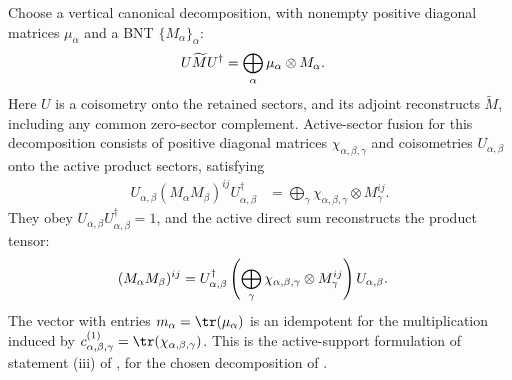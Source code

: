 \begin{definition}%
    \label{def:mpdo_bnt_fusion_tensor_clause}
    \leanok
    Choose a vertical canonical decomposition, with nonempty positive
    diagonal matrices $\mu_\alpha$ and a BNT $\{M_\alpha\}_\alpha$:
    \begin{align}
        U\widetilde M U^\dagger
         & =\bigoplus_\alpha \mu_\alpha\otimes M_\alpha.
        \notag
    \end{align}
    Here $U$ is a coisometry onto the retained sectors, and its adjoint
    reconstructs $\widetilde M$, including any common zero-sector complement.
    Active-sector fusion for this decomposition consists of positive diagonal
    matrices $\chi_{\alpha,\beta,\gamma}$ and coisometries
    $U_{\alpha,\beta}$ onto the active product sectors, satisfying
    \begin{align}
        U_{\alpha,\beta}(M_\alpha M_\beta)^{ij}
        U_{\alpha,\beta}^\dagger
         & =\bigoplus_\gamma
        \chi_{\alpha,\beta,\gamma}\otimes M_\gamma^{ij}.
        \label{eq:rfp_active_fusion}
    \end{align}
    They obey $U_{\alpha,\beta}U_{\alpha,\beta}^\dagger=1$, and the active
    direct sum reconstructs the product tensor:
    \begin{align}
        (M_\alpha M_\beta)^{ij}
         & =U_{\alpha,\beta}^\dagger
        \left(\bigoplus_\gamma
        \chi_{\alpha,\beta,\gamma}\otimes M_\gamma^{ij}\right)
        U_{\alpha,\beta}.
        \notag
    \end{align}
    The vector with entries $m_\alpha=\tr(\mu_\alpha)$ is an idempotent
    for the multiplication induced by
    $c^{(1)}_{\alpha,\beta,\gamma}=\tr(\chi_{\alpha,\beta,\gamma})$.
    This is the active-support formulation of statement (iii) of
    \cite[Theorem~4.14, lines~986--993]{Cirac2016MPDO_arXiv}, for the
    chosen decomposition of
    \cite[Proposition~4.13, lines~943--951]{Cirac2016MPDO_arXiv}.
\end{definition}

